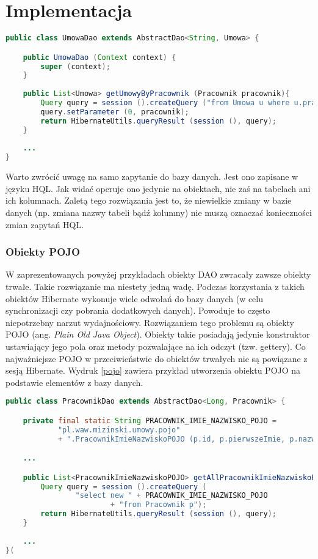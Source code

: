 \chapter{Implementacja}
\label{chap6}
\begin{lstlisting}[language=Java,style=outcode,showstringspaces=false,caption=Klasa dao służąca do operacji na umowach,label={umowaDao}]
public class UmowaDao extends AbstractDao<String, Umowa> {

	public UmowaDao (Context context) {
		super (context);
	}
	
	public List<Umowa> getUmowyByPracownik (Pracownik pracownik){
		Query query = session ().createQuery ("from Umowa u where u.pracownik=?");
		query.setParameter (0, pracownik);
		return HibernateUtils.queryResult (session (), query);
	}
	
	...
}
\end{lstlisting}

Warto zwrócić uwagę na samo zapytanie do bazy danych. Jest ono zapisane w języku HQL. Jak widać operuje ono jedynie na obiektach, nie zaś na tabelach ani ich kolumnach. Zaletą tego rozwiązania jest to, że niewielkie zmiany w bazie danych (np. zmiana nazwy tabeli bądź kolumny) nie muszą oznaczać konieczności zmian zapytań HQL.

\subsection[Obiekty POJO][Obiekty POJO]{Obiekty POJO}
W zaprezentowanych powyżej przykładach obiekty DAO zwracały zawsze obiekty trwałe. Takie rozwiązanie ma niestety jedną wadę. Podczas korzystania z takich obiektów Hibernate wykonuje wiele odwołań do bazy danych (w celu synchronizacji czy pobrania dodatkowych danych). Powoduje to często niepotrzebny narzut wydajnościowy. Rozwiązaniem tego problemu są obiekty POJO (ang. \textit{Plain Old Java Object}). Obiekty takie posiadają jedynie konstruktor ustawiający jego pola oraz metody pozwalające na ich odczyt (tzw. gettery). Co najważniejsze POJO w przeciwieństwie do obiektów trwałych nie są powiązane z sesją Hibernate. Wydruk \ref{pojo} zawiera przykład utworzenia obiektu POJO na podstawie elementów z bazy danych.

\begin{lstlisting}[language=Java,style=outcode,showstringspaces=false,caption=Metoda DAO zwracająca listę obiektów POJO,label={pojo}]
public class PracownikDao extends AbstractDao<Long, Pracownik> {

	private final static String PRACOWNIK_IMIE_NAZWISKO_POJO = 
			"pl.waw.mizinski.umowy.pojo"
			+ ".PracownikImieNazwiskoPOJO (p.id, p.pierwszeImie, p.nazwisko)";

	...

	public List<PracownikImieNazwiskoPOJO> getAllPracownikImieNazwiskoPOJOs () {
		Query query = session ().createQuery (
				"select new " + PRACOWNIK_IMIE_NAZWISKO_POJO
						+ "from Pracownik p");
		return HibernateUtils.queryResult (session (), query);
	}
	
	...
}(
\end{lstlisting}

